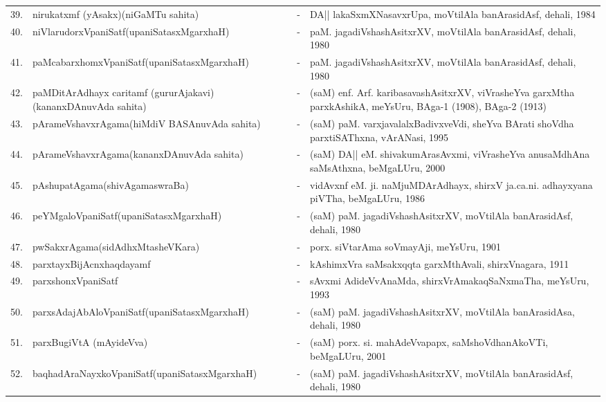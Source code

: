 {\begin{longtable}{rp{6cm}cp{9cm}<{\raggedright}}
39. & nirukatxmf (yAsakx)\newline (niGaMTu sahita) &-& DA|| lakaSxmXNasavxrUpa, moVtilAla banArasidAsf, dehali, 1984\\
40. & niVlarudorxVpaniSatf\newline (upaniSatasxMgarxhaH) &-& paM. jagadiVshashAsitxrXV, moVtilAla banArasidAsf, dehali, 1980\\
41. & paMcabarxhomxVpaniSatf\newline (upaniSatasxMgarxhaH) &-& paM. jagadiVshashAsitxrXV, moVtilAla banArasidAsf, dehali, 1980\\
42. & paMDitArAdhayx caritamf (gururAjakavi)\newline (kananxDAnuvAda sahita) &-& (saM) enf. Arf. karibasavashAsitxrXV, viVrasheYva garxMtha parxkAshikA, meYsUru, BAga-1 (1908), BAga-2 (1913)\\
43. & pArameVshavxrAgama\newline (hiMdiV BASAnuvAda sahita) &-& (saM) paM. varxjavalalxBadivxveVdi, sheYva BArati shoVdha parxtiSAThxna, vArANasi, 1995\\
44. & pArameVshavxrAgama\newline (kananxDAnuvAda sahita) &-& (saM) DA|| eM. shivakumArasAvxmi, viVrasheYva anusaMdhAna saMsAthxna, beMgaLUru, 2000\\
45. & pAshupatAgama\newline (shivAgamaswraBa) &-& vidAvxnf eM. ji. naMjuMDArAdhayx, shirxV ja.ca.ni. adhayxyana piVTha, beMgaLUru, 1986\\
46. & peYMgaloVpaniSatf\newline (upaniSatasxMgarxhaH) &-& (saM) paM. jagadiVshashAsitxrXV, moVtilAla banArasidAsf, dehali, 1980\\
47. & pwSakxrAgama\newline (sidAdhxMtasheVKara) &-& porx. siVtarAma soVmayAji, meYsUru, 1901\\
48. & parxtayxBijAcnxhaqdayamf &-& kAshimxVra saMsakxqqta garxMthAvali, shirxVnagara, 1911\\
49. & parxshonxVpaniSatf &-& sAvxmi AdideVvAnaMda, shirxVrAmakaqSaNxmaTha, meYsUru, 1993\\
50. & parxsAdajAbAloVpaniSatf\newline (upaniSatasxMgarxhaH) &-& (saM) paM. jagadiVshashAsitxrXV, moVtilAla banArasidAsa, dehali, 1980\\
51. & parxBugiVtA (mAyideVva) &-& (saM) porx. si. mahAdeVvapapx, saMshoVdhanAkoVTi, beMgaLUru, 2001\\
52. & baqhadAraNayxkoVpaniSatf\newline (upaniSatasxMgarxhaH) &-& (saM) paM. jagadiVshashAsitxrXV, moVtilAla banArasidAsf, dehali, 1980\\

\end{longtable}}
